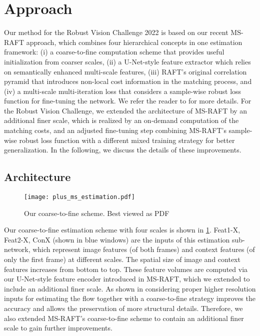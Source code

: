 \documentclass[conference,compsoc,a4paper]{IEEEtran}[2015/08/26]
\begin{document}
\section{Approach}
\label{sec:Approach}
Our method for the Robust Vision Challenge 2022 is based on our recent MS-RAFT approach, which combines four hierarchical concepts in one  estimation framework: (i) a coarse-to-fine computation scheme that provides useful initialization from coarser scales, (ii) a U-Net-style feature extractor which relies on semantically enhanced multi-scale features, (iii) 
RAFT's original correlation pyramid that introduces non-local cost information in the matching process, and (iv) a multi-scale multi-iteration loss that considers
a sample-wise robust loss function for fine-tuning the network.
We refer the reader to \cite{Jahedi2022_MSRAFT} for more details. 
For the Robust Vision Challenge, we extended the architecture of MS-RAFT by an additional finer scale, which is realized by an on-demand computation of the matching costs, and an adjusted fine-tuning step combining MS-RAFT's sample-wise robust loss function with a different mixed training strategy for better generalization. In the following, we discuss the details of these improvements.
\subsection{Architecture}
\label{subsec:architecture}
\begin{figure}
    \centering
       \texttt{[image: plus\_ms\_estimation.pdf]}
    \caption{Our coarse-to-fine scheme. Best viewed as PDF} 
    \label{fig:ctf-flow-estimation}
\end{figure}
Our coarse-to-fine estimation scheme with four scales is shown in 
\cref{fig:ctf-flow-estimation}. Feat1-X, Feat2-X, ConX (shown in blue windows) are the inputs of this estimation sub-network, which represent image features (of both frames) and context features (of only the first frame) at different scales.
The spatial size of image and context features increases from bottom to top.
These feature volumes are computed via our U-Net-style feature encoder introduced in MS-RAFT, which we extended to include an additional finer scale. As shown in 
\cite{Jahedi2022_MSRAFT}
considering proper higher resolution inputs for estimating the flow together with a coarse-to-fine strategy improves the accuracy and allows the preservation of more structural details.
Therefore, we also extended MS-RAFT's coarse-to-fine scheme to contain an additional finer scale to gain further improvements. 
\end{document}
